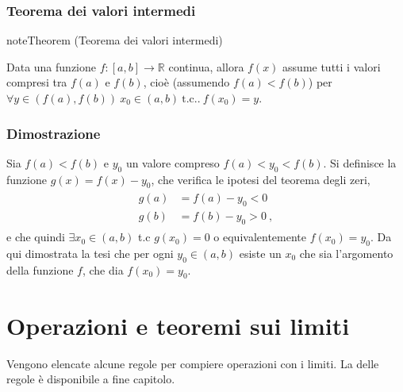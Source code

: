 \documentclass[letterpaper,10pt,italian]{jupyterBook}
\begin{document}
\subsubsection{Teorema dei valori intermedi}
\label{\detokenize{ch/infinitesimal_calculus/analysis:teorema-dei-valori-intermedi}}\label{\detokenize{ch/infinitesimal_calculus/analysis:infinitesimal-calculus-continuous-fun-thms-intermediate}}\label{None:thm:infinitesimal-calculus:continuous-fun:thms:intermediate}
\begin{sphinxadmonition}{note}{Theorem  (Teorema dei valori intermedi)}



\sphinxAtStartPar
Data una funzione \(f: [a,b] \rightarrow \mathbb{R}\) continua, allora \(f(x)\) assume tutti i valori compresi tra \(f(a)\) e \(f(b)\), cioè (assumendo \(f(a) < f(b)\)) per \(\forall y \in (f(a), f(b)) \ x_0 \in (a,b) \ \text{t.c..} \ f(x_0) = y\).
\end{sphinxadmonition}
\subsubsection*{Dimostrazione}

\sphinxAtStartPar
Sia \(f(a) < f(b)\) e \(y_0\) un valore compreso \(f(a) < y_0 < f(b)\). Si definisce la funzione \(g(x) = f(x) - y_0\), che verifica le ipotesi del teorema degli zeri,
\begin{equation*}
\begin{split}\begin{aligned}
  g(a) & = f(a) - y_0 < 0 \\
  g(b) & = f(b) - y_0 > 0 \ ,
\end{aligned}\end{split}
\end{equation*}
\sphinxAtStartPar
e che quindi \(\exists x_0 \in (a,b)\) t.c \(g(x_0) = 0\) o equivalentemente \(f(x_0) = y_0\). Da qui dimostrata la tesi che per ogni \(y_0 \in (a,b)\) esiste un \(x_0\) che sia l’argomento della funzione \(f\), che dia \(f(x_0) = y_0\).


\section{Operazioni e teoremi sui limiti}
\label{\detokenize{ch/infinitesimal_calculus/analysis:operazioni-e-teoremi-sui-limiti}}\label{\detokenize{ch/infinitesimal_calculus/analysis:infinitesimal-calculus-limits-thms}}
\sphinxAtStartPar
Vengono elencate alcune regole per compiere operazioni con i limiti. La {\hyperref[\detokenize{ch/infinitesimal_calculus/analysis-notes:infinitesimal-calculus-limits-thms-notes}]{}} delle regole è disponibile a fine capitolo.
\end{document}
